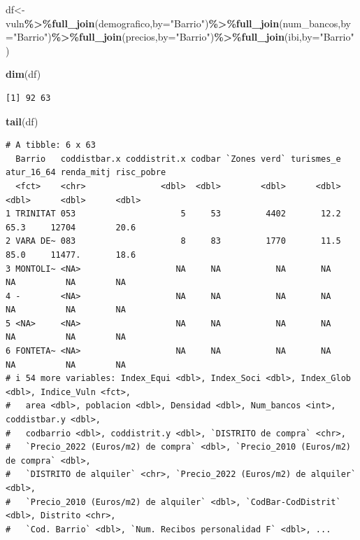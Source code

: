 \documentclass[notspecified,article,submit,moreauthors,pdftex]{Definitions/mdpi}
\newenvironment{Shaded}{\begin{snugshade}}{\end{snugshade}}
\newcommand{\AttributeTok}[1]{\textcolor[rgb]{0.13,0.29,0.53}{#1}}
\newcommand{\FunctionTok}[1]{\textcolor[rgb]{0.13,0.29,0.53}{\textbf{#1}}}
\newcommand{\NormalTok}[1]{#1}
\newcommand{\OtherTok}[1]{\textcolor[rgb]{0.56,0.35,0.01}{#1}}
\newcommand{\SpecialCharTok}[1]{\textcolor[rgb]{0.81,0.36,0.00}{\textbf{#1}}}
\newcommand{\StringTok}[1]{\textcolor[rgb]{0.31,0.60,0.02}{#1}}
\begin{document}
\begin{Shaded}
\begin{Highlighting}[]
\NormalTok{df}\OtherTok{\textless{}{-}}\NormalTok{vuln}\SpecialCharTok{\%\textgreater{}\%}\FunctionTok{full\_join}\NormalTok{(demografico,}\AttributeTok{by=}\StringTok{"Barrio"}\NormalTok{)}\SpecialCharTok{\%\textgreater{}\%}\FunctionTok{full\_join}\NormalTok{(num\_bancos,}\AttributeTok{by=}\StringTok{"Barrio"}\NormalTok{)}\SpecialCharTok{\%\textgreater{}\%}\FunctionTok{full\_join}\NormalTok{(precios,}\AttributeTok{by=}\StringTok{"Barrio"}\NormalTok{)}\SpecialCharTok{\%\textgreater{}\%}\FunctionTok{full\_join}\NormalTok{(ibi,}\AttributeTok{by=}\StringTok{"Barrio"}\NormalTok{)}

\FunctionTok{dim}\NormalTok{(df)}
\end{Highlighting}
\end{Shaded}

\begin{verbatim}
[1] 92 63
\end{verbatim}

\begin{Shaded}
\begin{Highlighting}[]
\FunctionTok{tail}\NormalTok{(df)}
\end{Highlighting}
\end{Shaded}

\begin{verbatim}
# A tibble: 6 x 63
  Barrio   coddistbar.x coddistrit.x codbar `Zones verd` turismes_e atur_16_64 renda_mitj risc_pobre
  <fct>    <chr>               <dbl>  <dbl>        <dbl>      <dbl>      <dbl>      <dbl>      <dbl>
1 TRINITAT 053                     5     53         4402       12.2       65.3     12704        20.6
2 VARA DE~ 083                     8     83         1770       11.5       85.0     11477.       18.6
3 MONTOLI~ <NA>                   NA     NA           NA       NA         NA          NA        NA  
4 -        <NA>                   NA     NA           NA       NA         NA          NA        NA  
5 <NA>     <NA>                   NA     NA           NA       NA         NA          NA        NA  
6 FONTETA~ <NA>                   NA     NA           NA       NA         NA          NA        NA  
# i 54 more variables: Index_Equi <dbl>, Index_Soci <dbl>, Index_Glob <dbl>, Indice_Vuln <fct>,
#   area <dbl>, poblacion <dbl>, Densidad <dbl>, Num_bancos <int>, coddistbar.y <dbl>,
#   codbarrio <dbl>, coddistrit.y <dbl>, `DISTRITO de compra` <chr>,
#   `Precio_2022 (Euros/m2) de compra` <dbl>, `Precio_2010 (Euros/m2) de compra` <dbl>,
#   `DISTRITO de alquiler` <chr>, `Precio_2022 (Euros/m2) de alquiler` <dbl>,
#   `Precio_2010 (Euros/m2) de alquiler` <dbl>, `CodBar-CodDistrit` <dbl>, Distrito <chr>,
#   `Cod. Barrio` <dbl>, `Num. Recibos personalidad F` <dbl>, ...
\end{verbatim}
\end{document}
